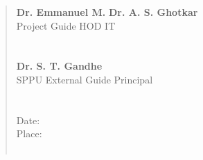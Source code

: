 \documentclass[12pt,a4paper]{report}     %
\begin{document}
\begin{quote}
\singlespace
\textbf{Dr. Emmanuel M.} %
\hspace{2in} \textbf{Dr. A. S. Ghotkar}\\
Project Guide\hspace{3.2 in}       HOD IT \\\\\\

\textbf{} %
\hspace{3.7in} \textbf{Dr. S. T. Gandhe}\\
SPPU External Guide\hspace{2.7in}       Principal \\\\\\

Date:       \\ %
Place:       %
\\\\


 \end{quote}
\end{document}
